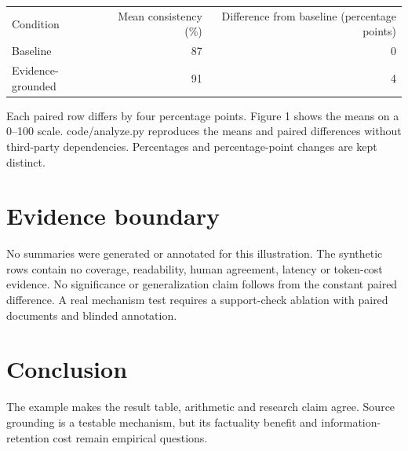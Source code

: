 \documentclass{article}
\begin{document}
\begin{center}\begin{tabular}{lrr}\hline
Condition & Mean consistency (\%) & Difference from baseline (percentage points) \\
Baseline & 87 & 0 \\
Evidence-grounded & 91 & 4 \\
\hline\end{tabular}\end{center}

Each paired row differs by four percentage points. Figure 1 shows the means on a 0–100 scale. code/analyze.py reproduces the means and paired differences without third-party dependencies. Percentages and percentage-point changes are kept distinct.

\section*{Evidence boundary}

No summaries were generated or annotated for this illustration. The synthetic rows contain no coverage, readability, human agreement, latency or token-cost evidence. No significance or generalization claim follows from the constant paired difference. A real mechanism test requires a support-check ablation with paired documents and blinded annotation.

\section*{Conclusion}

The example makes the result table, arithmetic and research claim agree. Source grounding is a testable mechanism, but its factuality benefit and information-retention cost remain empirical questions.
\end{document}
